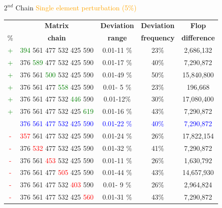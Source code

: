 \documentclass[10pts]{beamer}
\begin{document}
	
	   
	   \begin{frame}{$2^{nd}$ Chain \hspace{30pt} \textcolor{orange}{Single element perturbation (5\%)}}
	   	\begin{tabular}{c|c | c |c | c}
	   		&\textbf{Matrix} & \textbf{Deviation} & \textbf{Deviation} & \textbf{Flop }\\
	   		\%&\textbf{chain}& \textbf{range}&\textbf{frequency}&\textbf{difference}\\
	   	    
	   	      \textcolor{green}{+}&\textcolor{green}{394} 561 477 532 425 590	&	0.01-11 \%	 &		23\%	&		2,686,132\\
	   	      \textcolor{green}{+}&376 	\textcolor{green}{589} 477 532 425 590	&	0.01-17 \%	 &		40\%	&		7,290,872\\	
	   	      \textcolor{green}{+}&376 561 	\textcolor{green}{500} 532 425 590	&	0.01-49 \%	 &		50\%	&		15,840,800\\	
	   	     \textcolor{green}{+} &376 561 477 	\textcolor{green}{558} 425 590	&	0.01- 5 \%	 &		23\%	&		   196,668\\
	   	     \textcolor{green}{+} &376 561 477 532 	\textcolor{green}{446} 590	&	0.01-12\%	 &		30\%	&		17,080,400\\
	   	      \textcolor{green}{+}&376 561 477 532 425 	\textcolor{green}{619}	&	0.01-16 \%	&		43\%	&		7,290,872\\
	   	      &\textcolor{blue}{376} \textcolor{blue}{561} \textcolor{blue}{477} \textcolor{blue}{532} \textcolor{blue}{425} \textcolor{blue}{590}	&	\textcolor{blue}{0.01-22 \%}	&		\textcolor{blue}{40\%}	&		\textcolor{blue}{7,290,872}\\
	   	     \textcolor{red}{-} &\textcolor{red}{357} 561 477 532 425 590	  &  	0.01-24 \%		&	26\%		&	17,822,154\\
	   	      \textcolor{red}{-} &376 	\textcolor{red}{532} 477 532 425 590	  &	    0.01-32 \%		&	41\%		&	7,290,872	\\
	   	    \textcolor{red}{-} &376 561 	\textcolor{red}{453} 532 425 590	  &	    0.01-11 \%		&	26\%		&	1,630,792	\\
	   	    \textcolor{red}{-} &376 561 477 	\textcolor{red}{505} 425 590	  &	    0.01-44 \%		&	43\%		&	14,657,930\\
	   	    \textcolor{red}{-} &376 561 477 532 	\textcolor{red}{403} 590	  &	    0.01- 9 \%		&	26\%		&	2,964,824\\
	   	    \textcolor{red}{-} &376 561 477 532 425 	\textcolor{red}{560}	  &	    0.01-31 \%		&	43\%		&	7,290,872\\
	   	      
	   		
	   	\end{tabular}
	   \end{frame}
	
\end{document}
